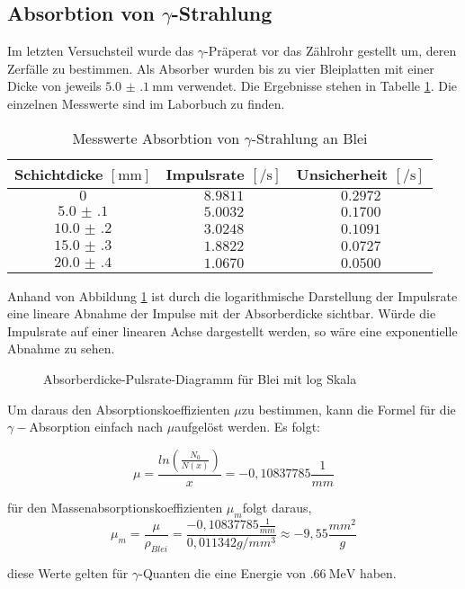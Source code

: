 \subsection{Absorbtion von $ \gamma $-Strahlung}
Im letzten Versuchsteil wurde das $\gamma$-Präperat vor das Zählrohr
gestellt um, deren Zerfälle zu bestimmen. Als Absorber wurden bis zu vier Bleiplatten mit einer Dicke von jeweils $ \SI{5.0(1)}{\milli\meter} $ verwendet. Die Ergebnisse stehen in Tabelle \ref{tab:abs_pb}. Die einzelnen Messwerte sind im Laborbuch zu finden.
\begin{table}[h!]
\centering
\begin{tabular}{c|c|c}
Schichtdicke $ [\si{\milli\meter}] $ & Impulsrate $ [\si{\per\second}] $ & Unsicherheit $ [\si{\per\second}] $ \\\hline
$ 0 $ & $ \num{8.9811} $ & $ \num{0.2972} $ \\
$ \num{5.0(1)} $ & $ \num{5.0032} $ & $ \num{0.1700} $ \\
$ \num{10.0(2)} $ & $ \num{3.0248} $ & $ \num{0.1091} $ \\
$ \num{15.0(3)} $ & $ \num{1.8822} $ & $ \num{0.0727} $ \\
$ \num{20.0(4)} $ & $ \num{1.0670} $ & $ \num{0.0500} $
\end{tabular}
\caption{Messwerte Absorbtion von $ \gamma $-Strahlung an Blei}
\label{tab:abs_pb}
\end{table}

Anhand von Abbildung \ref{fig:pb_log} ist durch die logarithmische Darstellung der
Impulsrate eine lineare Abnahme der Impulse mit der Absorberdicke
sichtbar. Würde die Impulsrate auf einer linearen Achse dargestellt
werden, so wäre eine exponentielle Abnahme zu sehen.

\begin{figure}[h!]
\centering

\caption{Absorberdicke-Pulsrate-Diagramm für Blei mit log Skala}
\label{fig:pb_log}
\end{figure}

Um daraus den Absorptionskoeffizienten $\mu$zu bestimmen, kann die
Formel für die $\gamma-$Absorption einfach nach $\mu$aufgelöst werden.
Es folgt:

\[
\mu=\frac{ln\left(\frac{N_{0}}{N(x)}\right)}{x}=-0,10837785\frac{1}{mm}
\]


für den Massenabsorptionskoeffizienten $\mu_{m}$folgt daraus,
\[
\mu_{m}=\frac{\mu}{\rho_{Blei}}=\frac{-0,10837785\frac{1}{mm}}{0,011342g/mm^{3}}\approx-9,55\frac{mm^{2}}{g}
\]


diese Werte gelten für $\gamma$-Quanten die eine Energie von $ \SI{.66}{\MeV} $
haben.
